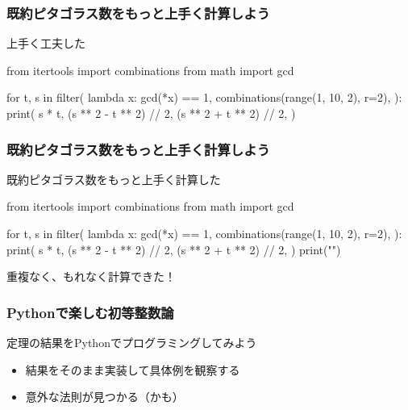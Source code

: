\documentclass[dvipdfmx,11pt,notheorems]{beamer}
\theoremstyle{definition}
\begin{document}


\begin{frame}[fragile]\frametitle{既約ピタゴラス数をもっと上手く計算しよう}

\begin{block}{上手く工夫した}
\begin{pyverbatim}
from itertools import combinations
from math import gcd

for t, s in filter(
    lambda x: gcd(*x) == 1,
    combinations(range(1, 10, 2), r=2),
):
    print(
        s * t,
        (s ** 2 - t ** 2) // 2,
        (s ** 2 + t ** 2) // 2,
    )
\end{pyverbatim}
\end{block}

\end{frame}

\begin{frame}[fragile]\frametitle{既約ピタゴラス数をもっと上手く計算しよう}

\begin{block}{既約ピタゴラス数をもっと上手く計算した}
\begin{pycode}
from itertools import combinations
from math import gcd

for t, s in filter(
    lambda x: gcd(*x) == 1,
    combinations(range(1, 10, 2), r=2),
):
    print(
        s * t,
        (s ** 2 - t ** 2) // 2,
        (s ** 2 + t ** 2) // 2,
    )
    print("\n")
\end{pycode}
\end{block}

重複なく、もれなく計算できた！

\end{frame}

\begin{frame}\frametitle{Pythonで楽しむ初等整数論}

\begin{block}{定理の結果をPythonでプログラミングしてみよう}
\begin{itemize}
\item 結果をそのまま実装して具体例を観察する
\item 意外な法則が見つかる（かも）
\end{itemize}
\end{block}

\end{frame}
\end{document}
